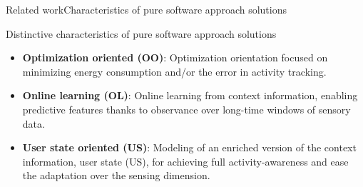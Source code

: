 \documentclass[8pt,xcolor={dvipsnames},handout]{beamer}
\begin{document}
\begin{frame}{Related work}{Characteristics of pure software approach solutions}
\begin{exampleblock}{Distinctive characteristics of pure software approach solutions}
\begin{itemize}
  \item \textbf{Optimization oriented (OO)}: Optimization orientation focused on minimizing energy consumption and/or the error in activity tracking.
  \item \textbf{Online learning (OL)}: Online learning from context information, enabling predictive features thanks to observance over long-time windows of sensory data.
  \item \textbf{User state oriented (US)}: Modeling of an enriched version of the context information, user state (US), for achieving full activity-awareness and ease the adaptation over the sensing dimension.
\end{itemize}
\end{exampleblock}
\end{frame}
\end{document}

